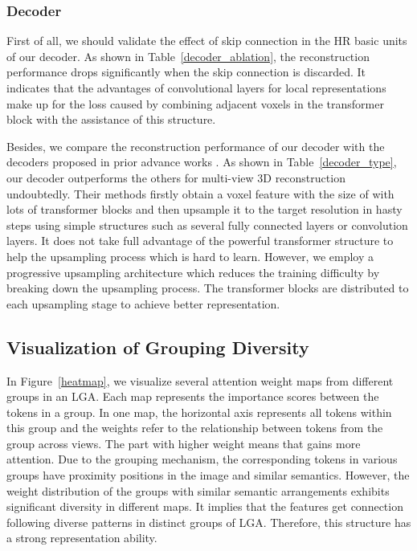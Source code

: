 \documentclass[10pt,twocolumn,letterpaper]{article}
\begin{document}
\begin{figure*}
  \centering
    \caption{Visualization of the attention weight maps from different groups in the -st head of the -nd LGA when processing 3-view input. There is a significant difference in the regions concerned by the attention operations between the groups, which ensures a diversity of the overall features. The complete maps are provided in the supplementary material.} \label{heatmap}
\end{figure*}

\subsubsection{Decoder}
First of all, we should validate the effect of skip connection in the HR basic units of our decoder. As shown in Table~\ref{decoder_ablation}, the reconstruction performance drops significantly when the skip connection is discarded. It indicates that the advantages of convolutional layers for local representations make up for the loss caused by combining adjacent voxels in the transformer block with the assistance of this structure.

Besides, we compare the reconstruction performance of our decoder with the decoders proposed in prior advance works \cite{wang2021multi, yagubbayli2021legoformer, shi20213d}. As shown in Table~\ref{decoder_type}, our decoder outperforms the others for multi-view 3D reconstruction undoubtedly. Their methods firstly obtain a voxel feature with the size of  with lots of transformer blocks and then upsample it to the target resolution in hasty steps using simple structures such as several fully connected layers or convolution layers. It does not take full advantage of the powerful transformer structure to help the upsampling process which is hard to learn. However, we employ a progressive upsampling architecture which reduces the training difficulty by breaking down the upsampling process. The transformer blocks are distributed to each upsampling stage to achieve better representation.

\subsection{Visualization of Grouping Diversity} 

In Figure~\ref{heatmap}, we visualize several attention weight maps from different groups in an LGA. Each map represents the importance scores between the tokens in a group. In one map, the horizontal axis represents all tokens within this group and the weights refer to the relationship between tokens from the group across views. The part with higher weight means that gains more attention. Due to the grouping mechanism, the corresponding tokens in various groups have proximity positions in the image and similar semantics. However, the weight distribution of the groups with similar semantic arrangements exhibits significant diversity in different maps. It implies that the features get connection following diverse patterns in distinct groups of LGA. Therefore, this structure has a strong representation ability.
\end{document}
